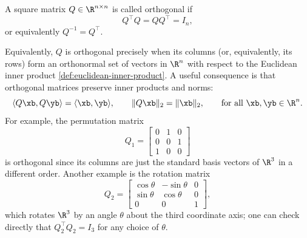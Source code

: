 \begin{definition}
    A square matrix $Q \in \R^{n \times n}$ is called orthogonal if
    \begin{equation*}
        Q^\top Q = Q Q^\top = I_n,
    \end{equation*}
    or equivalently $Q^{-1} = Q^\top$.
\end{definition}
Equivalently, $Q$ is orthogonal precisely when its columns (or, equivalently, its rows) form an orthonormal set of vectors in $\R^n$ with respect to the Euclidean inner product \eqref{def:euclidean-inner-product}. A useful consequence is that orthogonal matrices preserve inner products and norms:
\begin{equation*}
    \langle Q\xb, Q\yb \rangle = \langle \xb, \yb \rangle, \qquad \|Q\xb\|_2 = \|\xb\|_2, \qquad \text{for all } \xb, \yb \in \R^n.
\end{equation*}
For example, the permutation matrix
\begin{equation*}
    Q_1 = \begin{bmatrix}
        0 & 1 & 0 \\
        0 & 0 & 1 \\
        1 & 0 & 0
    \end{bmatrix}
\end{equation*}
is orthogonal since its columns are just the standard basis vectors of $\R^3$ in a different order. Another example is the rotation matrix
\begin{equation*}
    Q_2 = \begin{bmatrix}
        \cos\theta & -\sin\theta & 0 \\
        \sin\theta & \cos\theta & 0 \\
        0 & 0 & 1
    \end{bmatrix},
\end{equation*}
which rotates $\R^3$ by an angle $\theta$ about the third coordinate axis; one can check directly that $Q_2^\top Q_2 = I_3$ for any choice of $\theta$.

